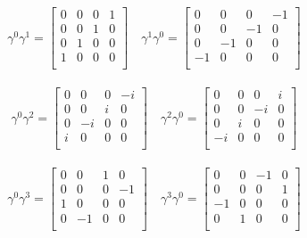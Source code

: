 \begin{align*}
\gamma^0 \gamma^1 = \begin{bmatrix}
 0  &  0  &  0  &  1  \\
 0  &  0  &  1  &  0  \\
 0  &  1  &  0  &  0  \\
 1  &  0  &  0  &  0  \\
\end{bmatrix} \quad
\gamma^1 \gamma^0 = \begin{bmatrix}
 0  &  0  &  0  &  -1  \\
 0  &  0  &  -1  &  0  \\
 0  &  -1  &  0  &  0  \\
 -1  &  0  &  0  &  0  \\
\end{bmatrix}
\end{align*}

\begin{align*}
\gamma^0 \gamma^2 = \begin{bmatrix}
 0  &  0  &  0  &  -i  \\
 0  &  0  &  i  &  0  \\
 0  &  -i  &  0  &  0  \\
 i  &  0  &  0  &  0  \\
\end{bmatrix} \quad
\gamma^2 \gamma^0 = \begin{bmatrix}
 0  &  0  &  0  &  i  \\
 0  &  0  &  -i  &  0  \\
 0  &  i  &  0  &  0  \\
 -i  &  0  &  0  &  0  \\
\end{bmatrix}
\end{align*}

\begin{align*}
\gamma^0 \gamma^3 = \begin{bmatrix}
 0  &  0  &  1  &  0  \\
 0  &  0  &  0  &  -1  \\
 1  &  0  &  0  &  0  \\
 0  &  -1  &  0  &  0  \\
\end{bmatrix} \quad
\gamma^3 \gamma^0 = \begin{bmatrix}
 0  &  0  &  -1  &  0  \\
 0  &  0  &  0  &  1  \\
 -1  &  0  &  0  &  0  \\
 0  &  1  &  0  &  0  \\
\end{bmatrix}
\end{align*}

